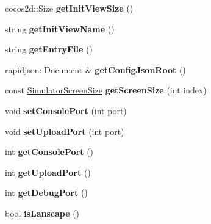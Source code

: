\begin{DoxyCompactItemize}
\mbox{\label{classConfigParser_a8a8e7406326c435544f850a999ddf012}} 
cocos2d\+::\+Size {\bfseries get\+Init\+View\+Size} ()
\item 
\mbox{\label{classConfigParser_a6d496d9a89cafeff2213c2c641c1e154}} 
string {\bfseries get\+Init\+View\+Name} ()
\item 
\mbox{\label{classConfigParser_aa1836e27e232e48f26758bb939b2c90a}} 
string {\bfseries get\+Entry\+File} ()
\item 
\mbox{\label{classConfigParser_a298bf6ddaa5b3121ed95d9b27dcac1cb}} 
rapidjson\+::\+Document \& {\bfseries get\+Config\+Json\+Root} ()
\item 
\mbox{\label{classConfigParser_abdf4e38c4e1465ad26bbe4634b944300}} 
const \hyperlink{struct__SimulatorScreenSize}{Simulator\+Screen\+Size} {\bfseries get\+Screen\+Size} (int index)
\item 
\mbox{\label{classConfigParser_ad9f42463a14c45d88b9e80c563baa538}} 
void {\bfseries set\+Console\+Port} (int port)
\item 
\mbox{\label{classConfigParser_a7be5f9dd18fb0bc080c183afaa7f49e4}} 
void {\bfseries set\+Upload\+Port} (int port)
\item 
\mbox{\label{classConfigParser_adcb7fe3088251c51044e757d50c95291}} 
int {\bfseries get\+Console\+Port} ()
\item 
\mbox{\label{classConfigParser_a2638e3b8d2fdb6d7476410021642dd13}} 
int {\bfseries get\+Upload\+Port} ()
\item 
\mbox{\label{classConfigParser_ad2927eaf355d08357c14be8bf7c62bb5}} 
int {\bfseries get\+Debug\+Port} ()
\item 
\mbox{\label{classConfigParser_a905a76a21f126ae443a590e72ad9c763}} 
bool {\bfseries is\+Lanscape} ()
\item 
\mbox{\label{classConfigParser_aa008f90e8fea9d8b047dd6f2c6baefa9}} 

\end{DoxyCompactItemize}
